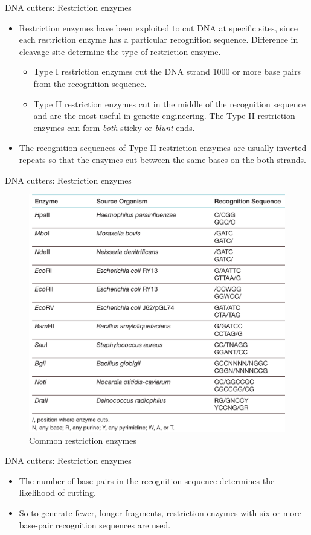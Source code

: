 \documentclass[
  ignorenonframetext,
  aspectratio=169]{beamer}
\providecommand{\tightlist}{%
  \setlength{\itemsep}{0pt}\setlength{\parskip}{0pt}}
\begin{document}
\begin{frame}{DNA cutters: Restriction enzymes}
\protect\hypertarget{dna-cutters-restriction-enzymes-2}{}
\begin{itemize}
\item
  Restriction enzymes have been exploited to cut DNA at specific sites,
  since each restriction enzyme has a particular recognition sequence.
  Difference in cleavage site determine the type of restriction enzyme.

  \begin{itemize}
  \tightlist
  \item
    Type I restriction enzymes cut the DNA strand 1000 or more base
    pairs from the recognition sequence.
  \item
    Type II restriction enzymes cut in the middle of the recognition
    sequence and are the most useful in genetic engineering. The Type II
    restriction enzymes can form \emph{both} sticky or \emph{blunt}
    ends.
  \end{itemize}
\item
  The recognition sequences of Type II restriction enzymes are usually
  inverted repeats so that the enzymes cut between the same bases on the
  both strands.
\end{itemize}
\end{frame}

\begin{frame}{DNA cutters: Restriction enzymes}
\protect\hypertarget{dna-cutters-restriction-enzymes-3}{}
\begin{figure}
\includegraphics[width=0.5\linewidth]{./../images/restriction_enzymes_ex} \caption{Common restriction enzymes}\label{fig:restriction-enzymes-ex}
\end{figure}
\end{frame}

\begin{frame}{DNA cutters: Restriction enzymes}
\protect\hypertarget{dna-cutters-restriction-enzymes-4}{}
\begin{itemize}
\tightlist
\item
  The number of base pairs in the recognition sequence determines the
  likelihood of cutting.
\item
  So to generate fewer, longer fragments, restriction enzymes with six
  or more base-pair recognition sequences are used.
\end{itemize}
\end{frame}
\end{document}
